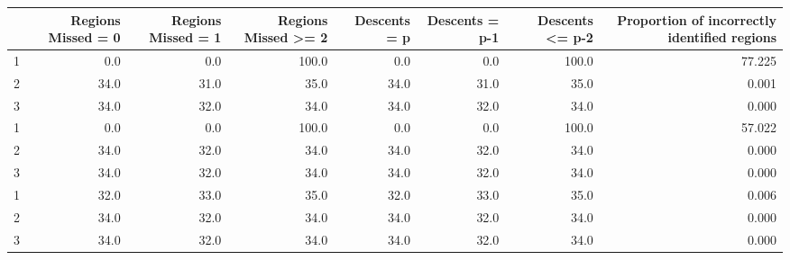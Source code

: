 \begin{tabular}{lrrrrrrr}
\toprule
{} &  Regions Missed = 0 &  Regions Missed = 1 &  Regions Missed >= 2 &  Descents = p &  Descents = p-1 &  Descents <= p-2 &  Proportion of incorrectly identified regions \\
\midrule
1 &                 0.0 &                 0.0 &                100.0 &           0.0 &             0.0 &            100.0 &                                        77.225 \\
2 &                34.0 &                31.0 &                 35.0 &          34.0 &            31.0 &             35.0 &                                         0.001 \\
3 &                34.0 &                32.0 &                 34.0 &          34.0 &            32.0 &             34.0 &                                         0.000 \\
1 &                 0.0 &                 0.0 &                100.0 &           0.0 &             0.0 &            100.0 &                                        57.022 \\
2 &                34.0 &                32.0 &                 34.0 &          34.0 &            32.0 &             34.0 &                                         0.000 \\
3 &                34.0 &                32.0 &                 34.0 &          34.0 &            32.0 &             34.0 &                                         0.000 \\
1 &                32.0 &                33.0 &                 35.0 &          32.0 &            33.0 &             35.0 &                                         0.006 \\
2 &                34.0 &                32.0 &                 34.0 &          34.0 &            32.0 &             34.0 &                                         0.000 \\
3 &                34.0 &                32.0 &                 34.0 &          34.0 &            32.0 &             34.0 &                                         0.000 \\
\bottomrule
\end{tabular}
